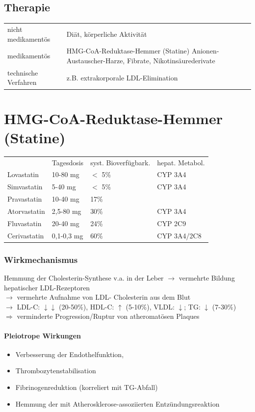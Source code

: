 \documentclass[10pt,a4paper]{report}
\begin{document}
\subsection{Therapie} %
\label{ssub:therapie}
\begin{tabularx}{\textwidth}{XX}
nicht medikamentös&Diät, körperliche Aktivität\\
medikamentös&HMG-CoA-Reduktase-Hemmer (Statine)	Anionen-Austauscher-Harze, Fibrate, Nikotinsäurederivate\\
technische Verfahren&z.B. extrakorporale LDL-Elimination\\
\end{tabularx}
\section{HMG-CoA-Reduktase-Hemmer (Statine)} %
\label{sec:hmg_coa_reduktase_hemmer_}
\begin{tabularx}{\textwidth}{XXXX}
&Tagesdosis&syst. Bioverfügbark.&hepat. Metabol.\\
Lovastatin&10-80 mg&$<$ 5\%&CYP 3A4\\
Simvastatin&5-40 mg&$<$ 5\%&CYP 3A4\\
Pravastatin&10-40 mg&17\%&\\
Atorvastatin&2,5-80 mg&30\%&CYP 3A4\\
Fluvastatin&20-40 mg&24\%&CYP 2C9\\
Cerivastatin&0,1-0,3 mg&60\%&CYP 3A4/2C8\\
\end{tabularx}
\subsubsection{Wirkmechanismus} %
\label{par:wirkmechanismus}
Hemmung der Cholesterin-Synthese v.a. in der Leber
$\rightarrow$ vermehrte Bildung hepatischer 
	LDL-Rezeptoren \\
$\rightarrow$ vermehrte Aufnahme von LDL-
	Cholesterin aus dem Blut \\
$\rightarrow$ LDL-C: $\downarrow$$\downarrow$ (20-50\%), 
	HDL-C: $\uparrow$ (5-10\%), VLDL: $\downarrow$; 
	TG: $\downarrow$ (7-30\%) \\
$\Rightarrow$  verminderte Progression/Ruptur von
atheromatösen Plaques
\paragraph{Pleiotrope Wirkungen} %
\label{subp:pleiotrope_wirk}
\begin{itemize}
	\item Verbesserung der Endothelfunktion,
	\item Thrombozytenstabilisation
	\item Fibrinogenreduktion (korreliert mit TG-Abfall)
	\item Hemmung der mit Atherosklerose-assoziierten Entzündungsreaktion
\end{itemize}
\end{document}
